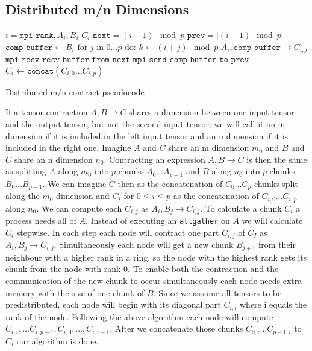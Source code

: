 \subsection{Distributed m/n Dimensions}

\begin{algorithm}[h]
        \begin{algorithmic}
        \Require $i = \texttt{mpi\_rank}, A_i, B_i$
        \Ensure $C_i$
        \State $\texttt{next} = (i+1) \mod p$
        \State $\texttt{prev} = |(i-1) \mod p|$
        \State $\texttt{comp\_buffer} \gets B_i$
        \State  $\text{for } j \text{ in } 0\dots p \text{ do:}$
        \State \indent $k \gets (i + j) \mod p$
        \State \indent {}
        \State \indent \indent $A_i, \texttt{comp\_buffer} \rightarrow C_{i,j}$
        \State \indent \indent $\texttt{mpi\_recv recv\_buffer from next}$
        \State \indent \indent $\texttt{mpi\_send comp\_buffer to prev}$
        \State $C_i \gets \texttt{concat}(C_{i,0}\dots C_{i,p})$
    \end{algorithmic}
    \caption{Distributed m/n contract pseudocode}
    \label{m_n_pseudocode}
\end{algorithm}

If a tensor contraction $A,B \rightarrow C$ shares a dimension between one input tensor and the output tensor, but not the second input tensor, we will call it an m dimension if it is included in the left input tensor and an n dimension if it is included in the right one.
Imagine $A$ and $C$ share an m dimension $m_0$ and $B$ and $C$ share an n dimension $n_0$.
Contracting an expression $A,B \rightarrow C$ is then the same as splitting $A$ along $m_0$ into $p$ chunks $A_0\dots A_{p-1}$ and $B$ along $n_0$ into $p$ chunks $B_0\dots B_{p-1}$.
We can imagine $C$ then as the concatenation of $C_0\dots C_p$ chunks split along the $m_0$ dimension and $C_i$ for $0 \leq i \leq p$ as the concatenation of $C_{i,0} \dots C_{i,p}$ along $n_0$.
We can compute each $C_{i,j}$ as $A_i,B_j \rightarrow C_{i,j}$.
To calculate a chunk $C_i$ a process needs all of $A$.
Instead of executing an \texttt{allgather} on $A$ we will calculate $C_i$ stepwise.
In each step each node will contract one part $C_{i,j}$ of $C_I$ as $A_i,B_j \rightarrow C_{i,j}$.
Simultaneously each node will get a new chunk $B_{j+1}$ from their neighbour with a higher rank in a ring, so the node with the highest rank gets its chunk from the node with rank 0.
To enable both the contraction and the communication of the new chunk to occur simultaneously each node needs extra memory with the size of one chunk of $B$.
Since we assume all tensors to be predistributed, each node will begin with its diagonal part $C_{i,i}$ where i equals the rank of the node.
Following the above algorithm each node will compute $C_{i,i}, \dots C_{i,p-1},C_{i,0},\dots,C_{i,i-1}$.
After we concatenate those chunks $C_{0,i}\dots C_{p-1,i}$ to $C_i$ our algorithm is done.

